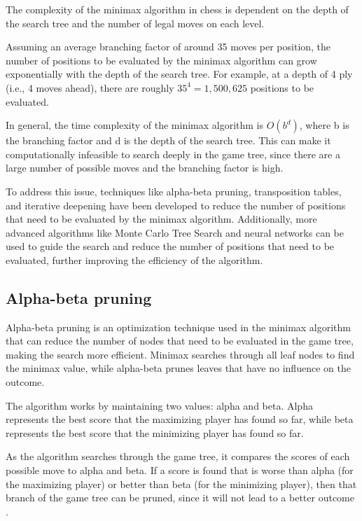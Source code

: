 The complexity of the minimax algorithm in chess is dependent on the depth of the search tree and the number of legal moves on each level.

Assuming an average branching factor of around 35 moves per position, the number of positions to be evaluated by the minimax algorithm can grow exponentially with the depth of the search tree. For example, at a depth of 4 ply (i.e., 4 moves ahead), there are roughly $35^{4} = 1,500,625$ positions to be evaluated.

In general, the time complexity of the minimax algorithm is $O(b^{d})$, where b is the branching factor and d is the depth of the search tree. This can make it computationally infeasible to search deeply in the game tree, since there are a large number of possible moves and the branching factor is high.

To address this issue, techniques like alpha-beta pruning, transposition tables, and iterative deepening have been developed to reduce the number of positions that need to be evaluated by the minimax algorithm. Additionally, more advanced algorithms like Monte Carlo Tree Search and neural networks can be used to guide the search and reduce the number of positions that need to be evaluated, further improving the efficiency of the algorithm.

\subsection{Alpha-beta pruning}
\label{subsec:ch2sec2subsec2}

Alpha-beta pruning is an optimization technique used in the minimax algorithm that can reduce the number of nodes that need to be evaluated in the game tree, making the search more efficient. Minimax searches through all leaf nodes to find the minimax value, while alpha-beta prunes leaves that have no influence on the outcome.

The algorithm works by maintaining two values: alpha and beta. Alpha represents the best score that the maximizing player has found so far, while beta represents the best score that the minimizing player has found so far.

As the algorithm searches through the game tree, it compares the scores of each possible move to alpha and beta. If a score is found that is worse than alpha (for the maximizing player) or better than beta (for the minimizing player), then that branch of the game tree can be pruned, since it will not lead to a better outcome \cite{carolus2006alpha}.

